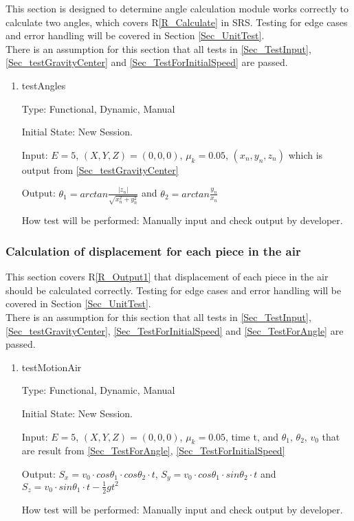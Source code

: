 \documentclass[12pt, titlepage]{article}
\newcommand{\rref}[1]{R\ref{#1}}
\begin{document}
This section is designed to determine  angle calculation module works correctly to calculate two angles, which covers \rref{R_Calculate} in SRS. Testing for edge cases and error handling will be covered in Section \ref{Sec_UnitTest}.\\
There is an assumption for this section that all tests in \ref{Sec_TestInput}, \ref{Sec_testGravityCenter} and \ref{Sec_TestForInitialSpeed} are passed.
\begin{enumerate}

\item{testAngles\\}

Type: Functional, Dynamic, Manual

Initial State: New Session.

Input: $E = 5$, $(X,Y,Z) = (0,0,0)$, $\mu_{k} = 0.05$, $(x_{n},y_{n},z_{n})$ which is output from \ref{Sec_testGravityCenter}  

Output: $\theta_{1}=arctan \frac{|z_{n}|}{\sqrt{x_{n}^2+y_{n}^2}}$ and $\theta_{2}=arctan \frac{y_{n}}{x_{n}}$

How test will be performed: Manually input and check output by developer.

\end{enumerate}

\subsubsection{Calculation of displacement for each piece in the air}
\label{Sec_TestMotionAir}

This section covers \rref{R_Output1} that displacement of each piece in the air should be calculated correctly. Testing for edge cases and error handling will be covered in Section \ref{Sec_UnitTest}.\\ 
There is an assumption for this section that all tests in \ref{Sec_TestInput}, \ref{Sec_testGravityCenter}, \ref{Sec_TestForInitialSpeed} and \ref{Sec_TestForAngle} are passed.
\begin{enumerate}

\item{testMotionAir\\}

Type: Functional, Dynamic, Manual

Initial State: New Session.

Input: $E = 5$, $(X,Y,Z) = (0,0,0)$, $\mu_{k} = 0.05$, time t, and $\theta_{1}$, $\theta_{2}$, $v_{0}$ that are result from \ref{Sec_TestForAngle}, \ref{Sec_TestForInitialSpeed}

Output: $S_{x}=v_{0}\cdot cos\theta _{1}\cdot cos\theta _{2}\cdot t$, $S_{y}=v_{0}\cdot cos\theta _{1}\cdot sin\theta _{2}\cdot t$ and $S_{z}=v_{0}\cdot sin\theta _{1}\cdot t-\frac{1}{2}gt^{2}$

How test will be performed: Manually input and check output by developer.

\end{enumerate}
\end{document}
